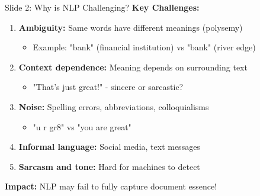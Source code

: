 \documentclass[8pt]{beamer}
\begin{document}
	\begin{frame}{Slide 2: Why is NLP Challenging?}
		\fontsize{6.5}{7.5}\selectfont
		\textbf{Key Challenges:}
		\begin{enumerate}
			\item \textbf{Ambiguity:} Same words have different meanings (polysemy)
			\begin{itemize}
				\item Example: "bank" (financial institution) vs "bank" (river edge)
			\end{itemize}
			\item \textbf{Context dependence:} Meaning depends on surrounding text
			\begin{itemize}
				\item "That's just great!" - sincere or sarcastic?
			\end{itemize}
			\item \textbf{Noise:} Spelling errors, abbreviations, colloquialisms
			\begin{itemize}
				\item "u r gr8" vs "you are great"
			\end{itemize}
			\item \textbf{Informal language:} Social media, text messages
			\item \textbf{Sarcasm and tone:} Hard for machines to detect
		\end{enumerate}
		
		\textcolor{myred}{\textbf{Impact:}} NLP may fail to fully capture document essence!
	\end{frame}
	
\end{document}
